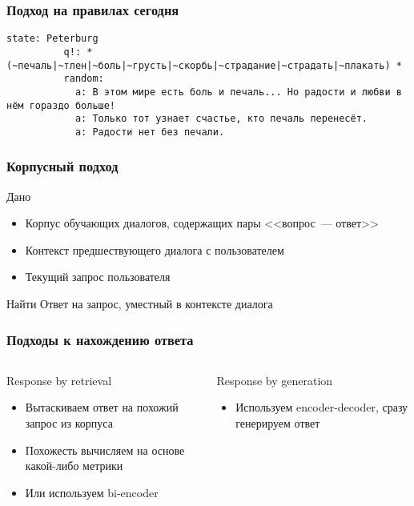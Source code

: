 \begin{frame}[fragile]
    \frametitle{Подход на правилах сегодня}

    \begin{Verbatim}[fontsize=\scriptsize, gobble=8]
        state: Peterburg
          q!: * (~печаль|~тлен|~боль|~грусть|~скорбь|~страдание|~страдать|~плакать) *
          random:
            a: В этом мире есть боль и печаль... Но радости и любви в нём гораздо больше!
            a: Только тот узнает счастье, кто печаль перенесёт.
            a: Радости нет без печали.
    \end{Verbatim}
\end{frame}

\begin{frame}
    \frametitle{Корпусный подход}

    \begin{block}{Дано}
        \begin{itemize}
            \item Корпус обучающих диалогов, содержащих пары <<вопрос~--- ответ>>
            \item Контекст предшествующего диалога с пользователем
            \item Текущий запрос пользователя
        \end{itemize}
    \end{block}

    \begin{alertblock}{Найти}
        Ответ на запрос, уместный в контексте диалога
    \end{alertblock}
\end{frame}

\begin{frame}
    \frametitle{Подходы к нахождению ответа}

    \begin{columns}
        \begin{block}{Response by retrieval}
            \begin{itemize}
                \item Вытаскиваем ответ на похожий запрос из корпуса
                \item Похожесть вычисляем на основе какой-либо метрики
                \item Или используем bi-encoder
            \end{itemize}
        \end{block}

        \begin{block}{Response by generation}
            \begin{itemize}
                \item Используем encoder-decoder, сразу генерируем ответ
            \end{itemize}
        \end{block}
    \end{columns}
\end{frame}
